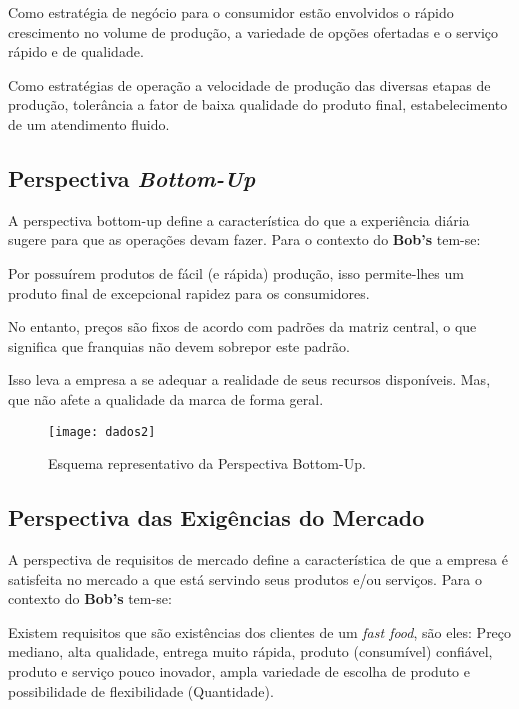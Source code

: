 			Como estratégia de negócio para o consumidor estão envolvidos o rápido crescimento no volume de produção, a variedade de opções ofertadas e o serviço rápido e de qualidade.

			Como estratégias de operação a velocidade de produção das diversas etapas de produção, tolerância a fator de baixa qualidade do produto final, estabelecimento de um atendimento fluido.

		\subsection[Perspectiva Bottom-Up]{Perspectiva \emph{Bottom-Up}}
		\label{sec:dados_perspSul}

			A perspectiva bottom-up define a característica do que a experiência diária sugere para que as operações devam fazer. Para o contexto do \textbf{Bob’s} tem-se:

			Por possuírem produtos de fácil (e rápida) produção, isso permite-lhes um produto final de excepcional rapidez para os consumidores. 

			No entanto, preços são fixos de acordo com padrões da matriz central, o que significa que franquias não devem sobrepor este padrão.

			Isso leva a empresa a se adequar a realidade de seus recursos disponíveis. Mas, que não afete a qualidade da marca de forma geral.

			\begin{figure}[h]
				\centering
				\texttt{[image: dados2]}
				\caption[Esquema representativo da Perspectiva Bottom-Up]{Esquema representativo da Perspectiva Bottom-Up. \cite{slack}}
				\label{fig:dados2}
			\end{figure}

		\subsection[Perspectiva das Exigências do Mercado]{Perspectiva das Exigências do Mercado}
		\label{sec:dados_perspLeste}
			
			A perspectiva de requisitos de mercado define a característica de que a empresa é satisfeita no mercado a que está servindo seus produtos e/ou serviços. Para o contexto do \textbf{Bob’s} tem-se:

			Existem requisitos que são existências dos clientes de um \emph{fast food}, são eles: Preço mediano, alta qualidade, entrega muito rápida, produto (consumível) confiável, produto e serviço pouco inovador, ampla variedade de escolha de produto e possibilidade de flexibilidade (Quantidade).

